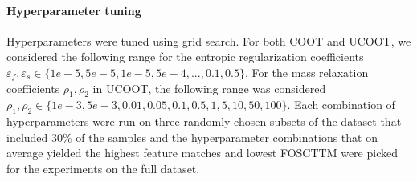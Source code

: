 
\paragraph{Hyperparameter tuning} Hyperparameters were tuned using grid search.
For both COOT and UCOOT, we considered the following range for the entropic regularization
coefficients $\varepsilon_f, \varepsilon_s \in \{1e-5, 5e-5, 1e-5, 5e-4, ... ,0.1, 0.5\}$.
For the mass relaxation coefficients $\rho_1, \rho_2 $ in UCOOT, the following range
was considered $\rho_1, \rho_2 \in \{1e-3, 5e-3, 0.01, 0.05, 0.1, 0.5, 1, 5, 10, 50 ,100\}$.
Each combination of hyperparameters were run on three randomly chosen subsets of the dataset
that included 30\% of the samples and the hyperparameter combinations that on average yielded
the highest feature matches and lowest FOSCTTM were picked for the experiments on the full dataset.


